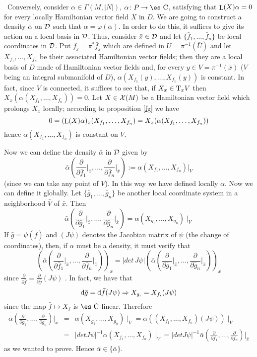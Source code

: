 \documentclass[12pt]{article}
\def\beann{\begin{eqnarray*}}
\def\eeann{\end{eqnarray*}}
\def\dst{\(}
\def\derpar#1#2{\frac{\partial{#1}}{\partial{#2}}}
\def\qed{\ifvmode\removelastskip\fi
{\unskip\nobreak\hfil\penalty50\hbox{}\nobreak\hfil
\hbox{\vrule height1.2ex width1.2ex}\parfillskip=0pt
\finalhyphendemerits=0 \par\smallskip}}
\def\d{{\rm d}}
\def\Complex{\mbox{\es C}}
\def\Tan{{\rm T}}
\def\Lie{\mathop{\rm L}\nolimits}
\begin{document}
\qquad \qquad \
Conversely, consider $\alpha \in \Gamma(M,| N |)$, $\alpha \colon P \to
\Complex$,
satisfying that $\Lie(X)\alpha = 0$
for every locally Hamiltonian vector field $X$ in $D$.
We are going to construct a density $\bar \alpha$  on ${\cal D}$ such
that
$\alpha = \varphi (\bar \alpha)$. In order to do this,
it suffices to give its action on a local basis in ${\cal D}$.
Thus, consider $\bar x \in {\cal D}$ and let $\{ \bar f_1,\ldots , \bar
f_n \}$
be local coordinates in ${\cal D}$. Put $f_j = \pi^*\bar f_j$
which are defined in $U = \pi^{-1}(\bar U)$ and let
$X_{f_1}, \ldots ,X_{f_n}$ be their associated Hamiltonian vector
fields;
then they are a local basis of $D$ made of Hamiltonian vector fields
and,
for every $y \in V = \pi^{-1} (\bar x)$ ($V$ being an integral
submanifold of $D$),
$\alpha (X_{f_1}(y), \ldots ,X_{f_n}(y))$ is constant. In fact,
since $V$ is connected, it suffices to see that, if $X_x \in \Tan_xV$
then $X_x(\alpha (X_{f_1}, \ldots ,X_{f_n}))=0$.
Let $X \in {\cal X}(M)$ be a Hamiltonian vector field
which prolongs $X_x$ locally; according to proposition \ref{fg}
we have
$$
0 = (\Lie(X)\alpha)_x(X_{f_1}, \ldots ,X_{f_n}) =
X_x(\alpha(X_{f_1}, \ldots ,X_{f_n}))
$$
hence $\alpha (X_{f_1}, \ldots ,X_{f_n})$ is constant on $V$.

Now we  can define the density $\bar \alpha$ in ${\cal D}$ given
by $$ \bar \alpha \left(\derpar{}{\bar f_1}\Big\vert_{\bar
x},\ldots , \derpar{}{\bar f_n}\Big\vert_{\bar x}\right) := \alpha
(X_{f_1}, \ldots ,X_{f_n}) \Big\vert_V $$ (since we can take any
point of $V$). In this way we have defined locally $\alpha$. Now
we can define it globally. Let $\{\bar g_1, \ldots ,\bar g_n \}$
be another local coordinate system in a neighborhood $\bar V$ of
$\bar x$. Then $$ \bar \alpha\left(\derpar{}{\bar
g_1}\Big\vert_{\bar x},\ldots , \derpar{}{\bar g_n}\Big\vert_{\bar
x}\right) = \alpha (X_{g_1}, \ldots ,X_{g_n}) \mid_V $$ If $\bar g
= \psi (\bar f)$ and $(J\psi )$ denotes the Jacobian matrix of
$\psi$ (the change of coordinates), then, if $\alpha$ must be a
density, it must verify that $$ \left(\bar
\alpha\left(\derpar{}{\bar f_1}\Big\vert_{\bar x},\ldots ,
\derpar{}{\bar f_n}\Big\vert_{\bar x}\right)\right)_x = |det\,
J\psi| \left(\bar \alpha\left(\derpar{}{\bar g_1}\Big\vert_{\bar
x},\ldots , \derpar{}{\bar g_n}\Big\vert_{\bar x}\right)\right)_x
$$ since \dst\derpar{}{\bar f} = \derpar{}{\bar g} (J\psi )\) . In
fact, we have that $$ \d \bar g = \d \bar f (J\psi ) \Rightarrow
X_{g_i} = X_{f_i} (J\psi) $$ since the map $\bar f\mapsto X_f$ is
$\Complex$-linear. Therefore \beann \bar
\alpha\left(\derpar{}{\bar g_1},\ldots ,\derpar{}{\bar
g_n}\right)\Big\vert_x &=& \alpha (X_{g_1}, \ldots ,X_{g_n})
\mid_V= \alpha ((X_{f_1}, \ldots ,X_{f_n})(J\psi )) \mid_V
\\ &=&
|detJ\psi |^{-1}\alpha (X_{f_1}, \ldots ,X_{f_n}) \mid_V=
|detJ\psi |^{-1} \bar \alpha\left(\derpar{}{f_1}, \ldots
,\derpar{}{f_n}\right)\Big\vert_{\bar x}
\eeann
as we wanted to prove. Hence $\bar \alpha \in \{\bar \alpha \}$.
\qed
\end{document}
